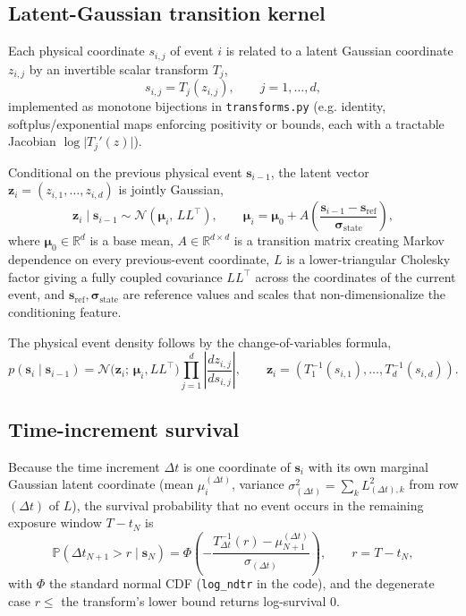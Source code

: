 \documentclass[11pt]{article}
\newcommand{\R}{\mathbb{R}}
\newcommand{\Prob}{\mathbb{P}}
\newcommand{\Normal}{\mathcal{N}}
\newcommand{\dt}{\Delta t}
\newcommand{\bs}{\mathbf s}
\newcommand{\bz}{\mathbf z}
\begin{document}
\subsection{Latent-Gaussian transition kernel}

Each physical coordinate $s_{i,j}$ of event $i$ is related to a latent
Gaussian coordinate $z_{i,j}$ by an invertible scalar transform $T_j$,
\begin{equation}
s_{i,j} = T_j(z_{i,j}), \qquad j = 1,\dots,d,
\end{equation}
implemented as monotone bijections in \texttt{transforms.py} (e.g. identity,
softplus/exponential maps enforcing positivity or bounds, each with a
tractable Jacobian $\log \lvert T_j'(z)\rvert$).

Conditional on the previous physical event $\bs_{i-1}$, the latent vector
$\bz_i = (z_{i,1},\dots,z_{i,d})$ is jointly Gaussian,
\begin{equation}
\bz_i \mid \bs_{i-1} \sim \Normal(\bm\mu_i,\, LL^\top),
\qquad
\bm\mu_i = \bm\mu_0 + A\left(\frac{\bs_{i-1} - \bs_{\mathrm{ref}}}{\bm\sigma_{\mathrm{state}}}\right),
\label{eq:latent-transition}
\end{equation}
where $\bm\mu_0 \in \R^d$ is a base mean, $A \in \R^{d\times d}$ is a
transition matrix creating Markov dependence on every previous-event
coordinate, $L$ is a lower-triangular Cholesky factor giving a fully coupled
covariance $LL^\top$ across the coordinates of the current event, and
$\bs_{\mathrm{ref}}, \bm\sigma_{\mathrm{state}}$ are reference values and
scales that non-dimensionalize the conditioning feature.

The physical event density follows by the change-of-variables formula,
\begin{equation}
p(\bs_i \mid \bs_{i-1})
=
\Normal\!\big(\bz_i;\, \bm\mu_i, LL^\top\big)
\prod_{j=1}^d \left\lvert \frac{d z_{i,j}}{d s_{i,j}} \right\rvert ,
\qquad \bz_i = (T_1^{-1}(s_{i,1}),\dots,T_d^{-1}(s_{i,d})).
\label{eq:event-density}
\end{equation}

\subsection{Time-increment survival}

Because the time increment $\dt$ is one coordinate of $\bs_i$ with its own
marginal Gaussian latent coordinate (mean $\mu_i^{(\dt)}$, variance
$\sigma^2_{(\dt)} = \sum_k L_{(\dt),k}^2$ from row $(\dt)$ of $L$), the
survival probability that no event occurs in the remaining exposure window
$T - t_N$ is
\begin{equation}
\Prob(\dt_{N+1} > r \mid \bs_N)
=
\Phi\!\left(-\frac{T_{\dt}^{-1}(r) - \mu_{N+1}^{(\dt)}}{\sigma_{(\dt)}}\right),
\qquad r = T - t_N,
\label{eq:survival}
\end{equation}
with $\Phi$ the standard normal CDF (\texttt{log\_ndtr} in the code), and the
degenerate case $r \le$ the transform's lower bound returns log-survival
$0$.
\end{document}
